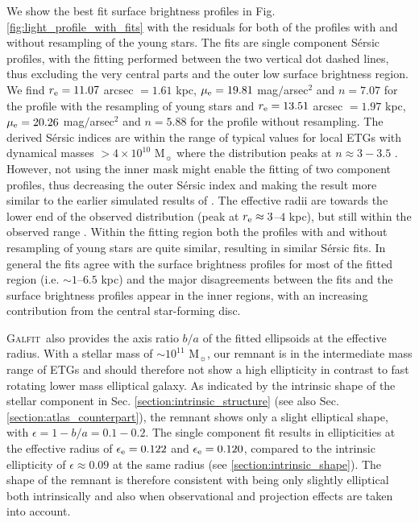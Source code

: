 \documentclass[a4paper,fleqn,usenatbib]{mnras}
\newcommand{\galfit}{\textsc{Galfit}}
\begin{document}
We show the best fit surface brightness profiles
in Fig. \ref{fig:light_profile_with_fits} with the residuals for both of the profiles with and without resampling of the young stars.
The fits are single component S\'{e}rsic profiles, with the fitting performed between the two vertical dot dashed lines, thus excluding 
the very central parts and the outer low surface brightness region. 
We find $r_{\rm{e}}=11.07$ arcsec $=1.61$ kpc, $\mu_{\rm{e}}=19.81$ mag$/$arsec$^2$ and $n=7.07$ for the profile with the resampling of young stars
and $r_{\rm{e}}=13.51$ arcsec $=1.97$ kpc, $\mu_{\rm{e}}=20.26$ mag$/$arsec$^2$ and $n=5.88$ for the profile without resampling. 
The derived S\'{e}rsic indices are within the range of typical values for local ETGs with
dynamical masses $> 4\times 10^{10}$ M$_{\sun}$ where the distribution peaks at $n\approx3-3.5$ \citep{2009ApJS..182..216K, 2013MNRAS.432.1768K}. 
However, not using the inner mask might enable the fitting of two component profiles, thus decreasing the outer S\'{e}rsic index and 
making the result more similar to the earlier simulated results of \citet{2008ApJ...679..156H,2009ApJS..181..135H,2009ApJS..181..486H}.
The effective radii are towards the lower end of the observed distribution (peak at $r_{\rm{e}}\approx3$--$4$ kpc), 
but still within the observed range \citep{2013MNRAS.432.1768K}. Within the fitting region both the profiles with and without
resampling of young stars are quite similar, resulting in similar S\'{e}rsic fits. In general the fits agree with the 
surface brightness profiles for most of the fitted region (i.e. $\sim 1$--$6.5$ kpc) and the major disagreements between the fits and
the surface brightness profiles appear in the inner regions, with an increasing contribution from the central star-forming disc.

\galfit\ also provides the axis ratio $b/a$ of the fitted ellipsoids at the effective radius. With a stellar mass of 
$\sim 10^{11}$ M$_{\sun}$, our remnant is in the intermediate mass range of ETGs
and should therefore not show a high ellipticity in contrast to fast
rotating lower mass elliptical galaxy. As indicated by the intrinsic shape of the 
stellar component in Sec. \ref{section:intrinsic_structure} (see also Sec. \ref{section:atlas_counterpart}), 
the remnant shows only a slight elliptical shape, with $\epsilon=1-b/a=0.1-0.2$.
The single component fit results in ellipticities at the effective radius of $\epsilon_{\rm{e}}=0.122$ and $\epsilon_{\rm{e}}=0.120$, compared to
the intrinsic ellipticity of $\epsilon\approx0.09$ at the same radius (see \ref{section:intrinsic_shape}). 
The shape of the remnant is therefore consistent with being only slightly elliptical both intrinsically
and also when observational and projection effects are taken into account.
\end{document}
